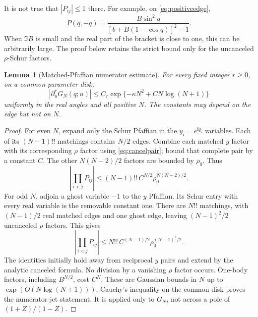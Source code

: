 \documentclass[11pt]{article}
\numberwithin{equation}{section}
\newtheorem{lemma}[theorem]{Lemma}
\theoremstyle{definition}
\newcommand{\ii}{\mathrm i}
\begin{document}
It is not true that $|P_{ij}|\le1$ there. For example, on
\eqref{eq:positiveedge},
\[
 P(q,-q)=\frac{B\sin^2q}
               {[b+B(1-\cos q)]^2-1}.
\]
When $\Im B$ is small and the real part of the bracket is close to one,
this can be arbitrarily large. The proof below retains the strict bound
only for the uncanceled $\rho$-Schur factors.

\begin{lemma}[Matched-Pfaffian numerator estimate]\label{lem:matching}
For every fixed integer $r\ge0$, on a common parameter disk,
\[
 |\partial_u^rG_N(q;u)|
 \le C_r\exp\{-\kappa N^2+C N\log(N+1)\}
\]
uniformly in the real angles and all positive $N$. The constants may
depend on the edge but not on $N$.
\end{lemma}
\begin{proof}
For even $N$, expand only the Schur Pfaffian in the $y_i=e^{\ii q_i}$
variables. Each of its $(N-1)!!$ matchings contains $N/2$ edges. Combine
each matched $y$ factor with its corresponding $\rho$ factor using
\eqref{eq:cancelpair}; bound that complete pair by a constant $C$.
The other $N(N-2)/2$ factors are bounded by $\rho_0$. Thus
\[
 \left|\prod_{i<j}P_{ij}\right|
 \le (N-1)!!\,C^{N/2}\rho_0^{N(N-2)/2}.
\]
For odd $N$, adjoin a ghost variable $-1$ to the $y$ Pfaffian.
Its Schur entry with every real variable is the removable constant one.
There are $N!!$ matchings, with $(N-1)/2$ real matched edges and one
ghost edge, leaving $(N-1)^2/2$ uncanceled $\rho$ factors. This gives
\[
 \left|\prod_{i<j}P_{ij}\right|
 \le N!!\,C^{(N-1)/2}\rho_0^{(N-1)^2/2}.
\]
The identities initially hold away from reciprocal $y$ pairs and extend
by the analytic canceled formula. No division by a vanishing $\rho$
factor occurs. One-body factors, including $B^{N/2}$, cost $C^N$.
These are Gaussian bounds in $N$ up to $\exp(O(N\log(N+1)))$.
Cauchy's inequality on the common disk proves the numerator-jet
statement. It is applied only to $G_N$, not across a pole of
$(1+Z)/(1-Z)$.
\end{proof}
\end{document}

